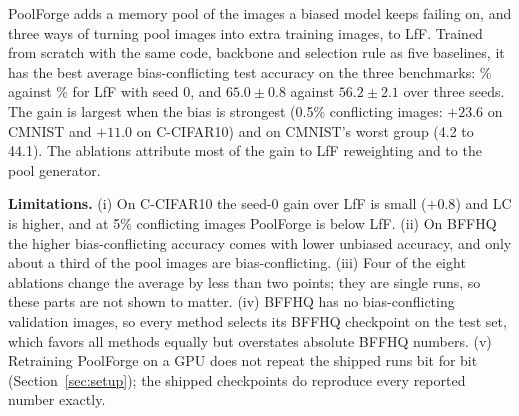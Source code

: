 PoolForge adds a memory pool of the images a biased model keeps failing on, and three ways of turning pool images
into extra training images, to LfF. Trained from scratch with the same code, backbone and selection rule as five
baselines, it has the best average bias-conflicting test accuracy on the three benchmarks: \PFavg\% against
\LFFavg\% for LfF with seed 0, and $65.0\pm0.8$ against $56.2\pm2.1$ over three seeds. The gain is largest when the
bias is strongest (0.5\% conflicting images: $+23.6$ on CMNIST and $+11.0$ on C-CIFAR10) and on CMNIST's worst
group (4.2 to 44.1). The ablations attribute most of the gain to LfF reweighting and to the pool generator.

\textbf{Limitations.} (i) On C-CIFAR10 the seed-0 gain over LfF is small ($+0.8$) and LC is higher, and at 5\%
conflicting images PoolForge is below LfF. (ii) On BFFHQ the higher bias-conflicting accuracy comes with lower
unbiased accuracy, and only about a third of the pool images are bias-conflicting. (iii) Four of the eight ablations
change the average by less than two points; they are single runs, so these parts are not shown to matter.
(iv) BFFHQ has no bias-conflicting validation images, so every method selects its BFFHQ checkpoint on the test set,
which favors all methods equally but overstates absolute BFFHQ numbers. (v) Retraining PoolForge on a GPU does not
repeat the shipped runs bit for bit (Section~\ref{sec:setup}); the shipped checkpoints do reproduce every reported
number exactly.
